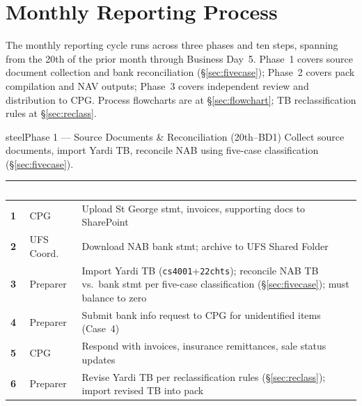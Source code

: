 \documentclass[10pt,a4paper]{article}
\begin{document}
\section{Monthly Reporting Process}
\label{sec:process}

\noindent The monthly reporting cycle runs across three phases and ten steps, spanning from the 20th of the prior month through Business Day~5. Phase~1 covers source document collection and bank reconciliation (\S\ref{sec:fivecase}); Phase~2 covers pack compilation and NAV outputs; Phase~3 covers independent review and distribution to CPG. Process flowcharts are at \S\ref{sec:flowchart}; TB reclassification rules at \S\ref{sec:reclass}.

\begin{phasebox}{steel}{Phase 1 --- Source Documents \& Reconciliation \normalfont\small(20th--BD1)}
Collect source documents, import Yardi TB, reconcile NAB using five-case classification (\S\ref{sec:fivecase}).
\end{phasebox}

{\small\sffamily
\begin{tabularx}{\textwidth}{@{}C{0.5cm} L{1.4cm} X@{}}
\textcolor{white}{\bfseries\#} & \textcolor{white}{\bfseries Actor} & \textcolor{white}{\bfseries Action} \\
\midrule
\textbf{1} & CPG & Upload St George stmt, invoices, supporting docs to SharePoint \\
\textbf{2} & UFS Coord. & Download NAB bank stmt; archive to UFS Shared Folder \\
\textbf{3} & Preparer & Import Yardi TB (\texttt{cs4001}+\texttt{22chts}); reconcile NAB TB vs.\ bank stmt per five-case classification (\S\ref{sec:fivecase}); must balance to zero \\
\textbf{4} & Preparer & Submit bank info request to CPG for unidentified items (Case~4) \\
\textbf{5} & CPG & Respond with invoices, insurance remittances, sale status updates \\
\textbf{6} & Preparer & Revise Yardi TB per reclassification rules (\S\ref{sec:reclass}); import revised TB into pack \\
\bottomrule
\end{tabularx}}
\end{document}
